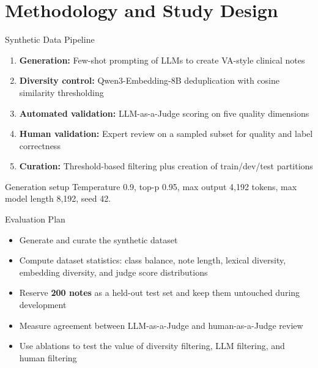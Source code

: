 \documentclass[aspectratio=169]{beamer}
\begin{document}
\section{Methodology and Study Design}

\begin{frame}{Synthetic Data Pipeline}
    \begin{enumerate}
        \item \textbf{Generation:} Few-shot prompting of LLMs to create VA-style clinical notes
        \item \textbf{Diversity control:} Qwen3-Embedding-8B deduplication with cosine similarity thresholding
        \item \textbf{Automated validation:} LLM-as-a-Judge scoring on five quality dimensions
        \item \textbf{Human validation:} Expert review on a sampled subset for quality and label correctness
        \item \textbf{Curation:} Threshold-based filtering plus creation of train/dev/test partitions
    \end{enumerate}

    \vspace{0.5em}
    \begin{block}{Generation setup}
        Temperature 0.9, top-p 0.95, max output 4,192 tokens, max model length 8,192, seed 42.
    \end{block}
\end{frame}

\begin{frame}{Evaluation Plan}
    \small
    \begin{itemize}
        \item Generate and curate the synthetic dataset
        \item Compute dataset statistics: class balance, note length, lexical diversity, embedding diversity, and judge score distributions
        \item Reserve \textbf{200 notes} as a held-out test set and keep them untouched during development
        \item Measure agreement between LLM-as-a-Judge and human-as-a-Judge review
        \item Use ablations to test the value of diversity filtering, LLM filtering, and human filtering
    \end{itemize}
\end{frame}
\end{document}
